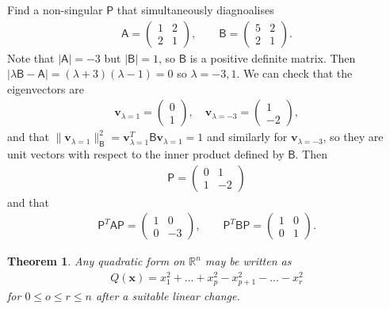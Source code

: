 \documentclass[letter-paper]{tufte-book}
\newtheorem{theorem}{\color{pastel-blue}Theorem}[section]
\newenvironment{example}[1][Example]{\begin{trivlist}
\item[\hskip \labelsep {\bfseries #1}]}{\end{trivlist}}
\newcommand{\As}{{\mathsf{A}}}
\newcommand{\Bs}{{\mathsf{B}}}
\newcommand{\Ps}{{\mathsf{P}}}
\newcommand{\vb}{{\boldsymbol{v}}}
\newcommand{\xb}{{\boldsymbol{x}}}
\begin{document}
\begin{example}
  Find a non-singular $\Ps$ that simultaneously diagnoalises
  \begin{align*}
    \As = \begin{pmatrix} 1 & 2 \\ 2 & 1 \end{pmatrix}, \qquad \Bs = \begin{pmatrix} 5 & 2 \\ 2 & 1 \end{pmatrix}.
  \end{align*}
  Note that $|\As| = -3$ but $|\Bs| = 1$, so $\Bs$ is a positive definite matrix. Then $|\lambda \Bs - \As| = (\lambda+3)(\lambda-1) = 0$ so $\lambda=-3, 1$. We can check that the eigenvectors are
  \begin{align*}
    \vb_{\lambda=1} = \begin{pmatrix} 0 \\ 1 \end{pmatrix}, \quad \vb_{\lambda=-3} = \begin{pmatrix} 1 \\ -2 \end{pmatrix},
  \end{align*}
  and that $\|\vb_{\lambda=1}\|^2_{\Bs} = \vb_{\lambda=1}^T \Bs \vb_{\lambda=1} = 1$ and similarly for $\vb_{\lambda=-3}$, so they are unit vectors with respect to the inner product defined by $\Bs$. Then
  \begin{align*}
    \Ps = \begin{pmatrix} 0 & 1 \\ 1 & -2 \end{pmatrix}
  \end{align*}
  and that
  \begin{align*}
    \Ps^T \As \Ps = \begin{pmatrix} 1 & 0 \\ 0 & -3 \end{pmatrix}, \qquad 
    \Ps^T \Bs \Ps = \begin{pmatrix} 1 & 0 \\ 0 & 1 \end{pmatrix}.
  \end{align*}
\end{example}

\begin{theorem}
 Any quadratic form on $\mathbb{R}^n$ may be written as
 \begin{align*}
  Q(\xb) = x_1^2 + \ldots + x_p^2 - x_{p+1}^2 - \ldots - x_r^2
 \end{align*}
 for $0 \leq o \leq r \leq n$ after a suitable linear change.
\end{theorem}
\end{document}
